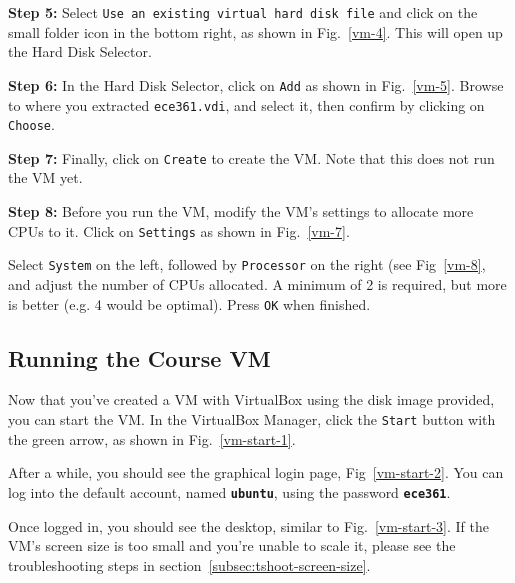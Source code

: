\documentclass[11pt]{article}
\begin{document}
\textbf{Step 5:} Select \texttt{Use an existing virtual hard disk file} and click on the small folder icon in the bottom right, as shown in Fig.~\ref{vm-4}. This will open up the Hard Disk Selector.

\textbf{Step 6:} In the Hard Disk Selector, click on \texttt{Add} as shown in Fig.~\ref{vm-5}. Browse to where you extracted \texttt{ece361.vdi}, and select it, then confirm by clicking on \texttt{Choose}.

\textbf{Step 7:} Finally, click on \texttt{Create} to create the VM. Note that this does not run the VM yet.

\textbf{Step 8:} Before you run the VM, modify the VM's settings to allocate more CPUs to it. Click on \texttt{Settings} as shown in Fig.~\ref{vm-7}.

Select \texttt{System} on the left, followed by \texttt{Processor} on the right (see Fig~\ref{vm-8}, and adjust the number of CPUs allocated. A minimum of 2 is required, but more is better (e.g. 4 would be optimal). Press \texttt{OK} when finished.

\subsection{Running the Course VM}
\label{subsec:run-vm}
Now that you've created a VM with VirtualBox using the disk image provided, you can start the VM. In the VirtualBox Manager, click the \texttt{Start} button with the green arrow, as shown in Fig.~\ref{vm-start-1}.

After a while, you should see the graphical login page, Fig~\ref{vm-start-2}. You can log into the default account, named \textbf{\texttt{ubuntu}}, using the password \textbf{\texttt{ece361}}.

Once logged in, you should see the desktop, similar to Fig.~\ref{vm-start-3}. If the VM's screen size is too small and you're unable to scale it, please see the troubleshooting steps in section~\ref{subsec:tshoot-screen-size}.
\end{document}
